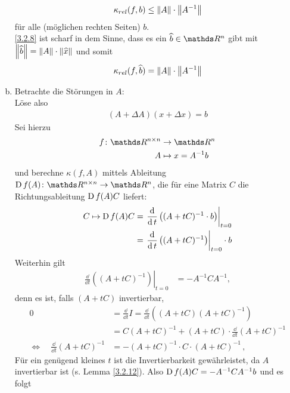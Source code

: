 \begin{Bspe}
\begin{enumerate}[a)]
    \begin{gather}
      \kappa_{rel}(f,b) \leq \nn[A] \cdot \nn[A^{-1}] \label{III.2.8}
    \end{gather}
    für alle (möglichen rechten Seiten) $b $.\\
    \ref{3.2.8} ist scharf in dem Sinne, dass es ein $\widehat{b}\in \R^n$ gibt 
    mit $\nn[\widehat{b}] = \nn[A]\cdot \nn[\widehat{x}]$ und somit
    \begin{gather*}
      \kappa_{rel}(f,\widehat{b}) = \nn[A]\cdot \nn[ A^{-1}]
    \end{gather*}
  \item Betrachte die Störungen in $A$:\\
    Löse also 
    \begin{gather*}
      (A+\Delta A)(x+\Delta x) = b
    \end{gather*}
    Sei hierzu
    \begin{align*}
      f\colon \R^{n\times n}&\to\R^n\\
      A&\mapsto x= A^{-1}b 
    \end{align*}
    und berechne $\kappa(f,A)$ mittels Ableitung
    $\D f(A)\colon\R^{n\times n}\to \R^n$, die für eine Matrix $C$ 
    die Richtungsableitung $\D f(A)C$ liefert:
    \begin{align*}
      C\mapsto \D f(A) C
      &=  \left.
        \frac{\dd}{\dd t}\left((A+tC)^{-1} \cdot b\right)
        \right|_{t=0} \\
      & = \left.
        \frac{\dd}{\dd t}\left((A+tC)^{-1}\right)
        \right|_{t=0}\cdot b
    \end{align*}			
    Weiterhin gilt
    \begin{align}
      \left. \frac{\dd}{\dd t} \left((A+tC)^{-1}\right) \right|_{t=0} 
      &=-A^{-1}CA^{-1},
        \label{III.2.9}
    \end{align}
    denn es ist, falls $(A+tC)$ invertierbar,
    \begin{align*}
      0 &= \frac{\dd}{\dd t}I
          = \frac{\dd}{\dd t}\left( (A+tC)(A+tC)^{-1}\right)\\
        &= C(A+tC)^{-1} +(A+tC)\cdot \frac{\dd}{\dd t}(A+tC)^{-1} \\
      \Longleftrightarrow\quad \frac{\dd}{\dd t} (A+ tC)^{-1} 
        &= -(A+tC)^{-1} \cdot C\cdot (A+tC)^{-1} \, ,
    \end{align*}
    Für ein genügend kleines $t$ ist die Invertierbarkeit
    gewährleistet, da $A$ invertierbar ist (s. Lemma \ref{3.2.12}).
    Also $\D f(A) C = -A^{-1}CA^{-1}b$ und es folgt

\end{enumerate}
\end{Bspe}
